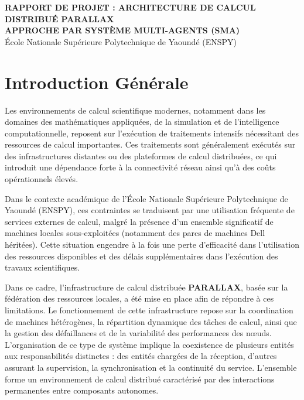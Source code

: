 \documentclass[12pt,a4paper]{report}
\begin{document}
\begin{titlepage}
    \centering
    \vspace*{2cm}
    {\Large\bfseries RAPPORT DE PROJET : ARCHITECTURE DE CALCUL DISTRIBUÉ PARALLAX \\}
    \vspace{1cm}
    {\large\bfseries APPROCHE PAR SYSTÈME MULTI-AGENTS (SMA) \\}
    \vfill
    \large École Nationale Supérieure Polytechnique de Yaoundé (ENSPY)
\end{titlepage}

\tableofcontents
\newpage

\chapter*{Introduction Générale}

Les environnements de calcul scientifique modernes, notamment dans les domaines des mathématiques appliquées, de la simulation et de l'intelligence computationnelle, reposent sur l'exécution de traitements intensifs nécessitant des ressources de calcul importantes. Ces traitements sont généralement exécutés sur des infrastructures distantes ou des plateformes de calcul distribuées, ce qui introduit une dépendance forte à la connectivité réseau ainsi qu'à des coûts opérationnels élevés.

Dans le contexte académique de l'École Nationale Supérieure Polytechnique de Yaoundé (ENSPY), ces contraintes se traduisent par une utilisation fréquente de services externes de calcul, malgré la présence d'un ensemble significatif de machines locales sous-exploitées (notamment des parcs de machines Dell héritées). Cette situation engendre à la fois une perte d'efficacité dans l'utilisation des ressources disponibles et des délais supplémentaires dans l'exécution des travaux scientifiques.

Dans ce cadre, l'infrastructure de calcul distribuée \textbf{PARALLAX}, basée sur la fédération des ressources locales, a été mise en place afin de répondre à ces limitations. Le fonctionnement de cette infrastructure repose sur la coordination de machines hétérogènes, la répartition dynamique des tâches de calcul, ainsi que la gestion des défaillances et de la variabilité des performances des nœuds. L'organisation de ce type de système implique la coexistence de plusieurs entités aux responsabilités distinctes : des entités chargées de la réception, d'autres assurant la supervision, la synchronisation et la continuité du service. L'ensemble forme un environnement de calcul distribué caractérisé par des interactions permanentes entre composants autonomes.
\end{document}
